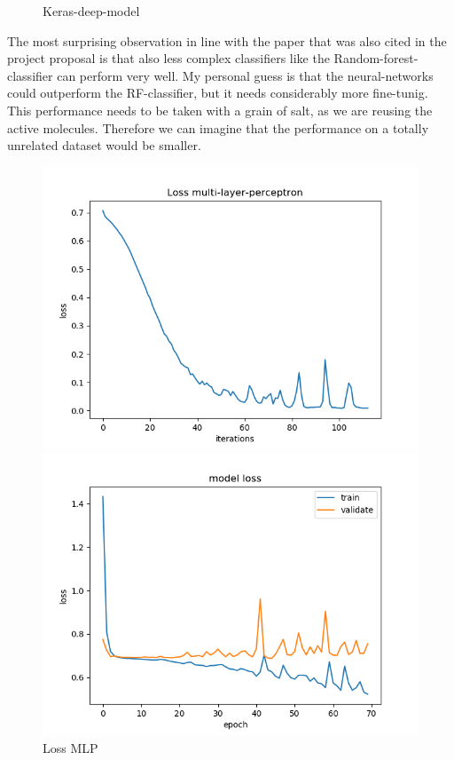 \documentclass[12pt]{article}
\begin{document}
\begin{figure}[!htb]
  \caption{Keras-deep-model}\label{fig:conf_m3}
\endminipage
\end{figure}

The most surprising observation in line with the paper \cite{robinson2020} that was also cited in the project proposal is that also less complex classifiers like the Random-forest-classifier can perform very well. My personal guess is that the neural-networks could outperform the RF-classifier, but it needs considerably more fine-tunig. This performance needs to be taken with a grain of salt, as we are reusing the active molecules. Therefore we can imagine that the performance on a totally unrelated dataset would be smaller.

\begin{figure}[!htb]
  \includegraphics[width=\linewidth]{./figures/multy_layer_perceptron_loss_curve.png}
  \caption{Loss MLP}\label{fig:loss_MLP}
\endminipage\hfill
{}
  \includegraphics[width=\linewidth]{./figures/keras-deep-model-loss-curve.png}

\end{figure}
\end{document}
